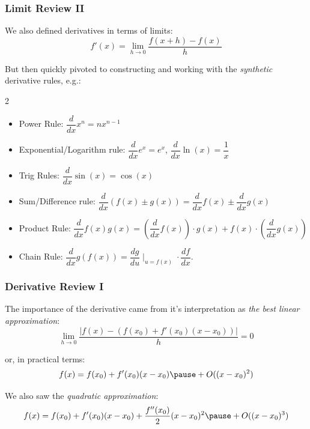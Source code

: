 \documentclass{ltx-talk}
\begin{document}
\begin{frame}
  \frametitle{Limit Review II}

  We also defined derivatives in terms of limits: \pause
  \begin{equation}
    f'(x) = \lim_{h \rightarrow 0} \dfrac{f(x + h) - f(x)}{h}
  \end{equation}\pause

  But then quickly pivoted to constructing and working with the \textit{synthetic} derivative rules, e.g.: \pause
  \begin{multicols}{2}
    \begin{itemize}
      \item Power Rule: $\dfrac{d}{dx} x^n = nx^{n-1}$
      \item Exponential/Logarithm rule: $\dfrac{d}{dx} e^x = e^x$, $\dfrac{d}{dx} \ln(x) = \dfrac{1}{x}$
      \item Trig Rules: $\dfrac{d}{dx} \sin(x) = \cos(x)$
      \item Sum/Difference rule: $\dfrac{d}{dx}(f(x) \pm g(x)) = \dfrac{d}{dx}f(x) \pm \dfrac{d}{dx}g(x)$
      \item Product Rule: $\dfrac{d}{dx} f(x)g(x) = \left(\dfrac{d}{dx} f(x)\right) \cdot g(x) + f(x) \cdot \left(\dfrac{d}{dx}g(x)\right)$
      \item Chain Rule: $\dfrac{d}{dx} g(f(x)) = \dfrac{dg}{du} \mid_{u = f(x)} \cdot \dfrac{df}{dx}$.
    \end{itemize}
  \end{multicols}
\end{frame}

\begin{frame}
  \frametitle{Derivative Review I}

  The importance of the derivative came from it's interpretation as
  \textit{the best linear approximation}: \pause
  \begin{equation}
    \lim\limits_{h \rightarrow 0} \dfrac{|f(x) - (f(x_0) + f'(x_0)(x - x_0))|}{h} = 0
  \end{equation} \pause

  or, in practical terms:
  \begin{equation}
    f(x) = f(x_0) + f'(x_0)(x - x_0) \pause + O((x - x_0)^2)
  \end{equation} \pause

  We also saw the \textit{quadratic approximation}:
  \begin{equation}
    f(x) = f(x_0) + f'(x_0)(x - x_0) + \dfrac{f''(x_0)}{2} (x - x_0)^2 \pause + O((x - x_0)^3)
  \end{equation}
\end{frame}
\end{document}
